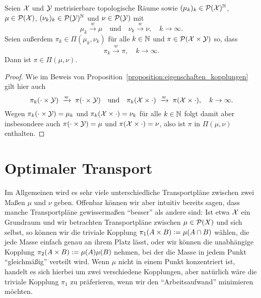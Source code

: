 \documentclass[../thesis/thesis.tex]{subfiles}
\begin{document}
	\begin{Proposition}
		\label{proposition:konvergenz_kopplungen}
		Seien $\mathcal{X}$ und $\mathcal{Y}$ metrisierbare topologische Räume sowie $(\mu_k)_k \in \mathcal{P}(\mathcal{X})^{\mathbb{N}}$, $\mu \in \mathcal{P}(\mathcal{X})$, $(\nu_k)_k \in \mathcal{P}(\mathcal{Y})^{\mathbb{N}}$ und $\nu \in \mathcal{P}(\mathcal{Y})$ mit
		\[ \mu_k \xrightarrow{w} \mu \quad \text{und} \quad \nu_k \xrightarrow{w} \nu, \quad k \to \infty \text{.} \]
		Seien außerdem $\pi_k \in \Pi(\mu_k, \nu_k)$ für alle $k \in \mathbb{N}$ und $\pi \in \mathcal{P}(\mathcal{X} \times \mathcal{Y})$ so, dass
		\[ \pi_k \xrightarrow{w} \pi, \quad k \to \infty \text{.} \]
		Dann ist $\pi \in \Pi(\mu, \nu)$.
	\end{Proposition}

	\begin{proof}
		Wie im Beweis von Proposition~\ref{proposition:eigenschaften_kopplungen} gilt hier auch
		\[ \pi_k(\cdot \times \mathcal{Y}) \; \xrightarrow{w} \; \pi(\cdot \times \mathcal{Y}) \quad \text{und} \quad \pi_k(\mathcal{X} \times \cdot) \; \xrightarrow{w} \; \pi(\mathcal{X} \times \cdot), \quad k \to \infty \text{.} \]
		Wegen $\pi_k(\cdot \times \mathcal{Y}) = \mu_k$ und $\pi_k(\mathcal{X} \times \cdot) = \nu_k$ für alle $k \in \mathbb{N}$ folgt damit aber insbesondere auch $\pi(\cdot \times \mathcal{Y}) = \mu$ und $\pi(\mathcal{X} \times \cdot) = \nu$, also
		ist $\pi$ in $\Pi(\mu, \nu)$ enthalten.
	\end{proof}

	\section{Optimaler Transport}
	\label{subsec:optimaler_transport}
	
	Im Allgemeinen wird es sehr viele unterschiedliche Transportpläne zwischen zwei Maßen $\mu$ und $\nu$ geben. Offenbar können wir aber intuitiv bereits sagen, dass manche Transportpläne gewissermaßen
	\enquote{besser} als andere sind: Ist etwa $\mathcal{X}$ ein Grundraum und wir betrachten Transportpläne zwischen $\mu \in \mathcal{P}(X)$ und sich selbst, so können wir die triviale Kopplung $\pi_1(A \times B) \vcentcolon = \mu(A \cap B)$ wählen, 
	die jede Masse einfach genau an ihrem Platz lässt, oder wir können die unabhängige Kopplung $\pi_2(A \times B) \vcentcolon = \mu(A) \mu(B)$ nehmen, bei der die Masse in jedem Punkt \enquote{gleichmäßig} 
	verteilt wird. Wenn $\mu$ nicht in einem Punkt konzentriert ist, handelt es sich hierbei um zwei verschiedene Kopplungen, aber natürlich wäre die triviale Kopplung $\pi_1$ zu präferieren, wenn wir den
	\enquote{Arbeitsaufwand} minimieren möchten. 
	
\end{document}
